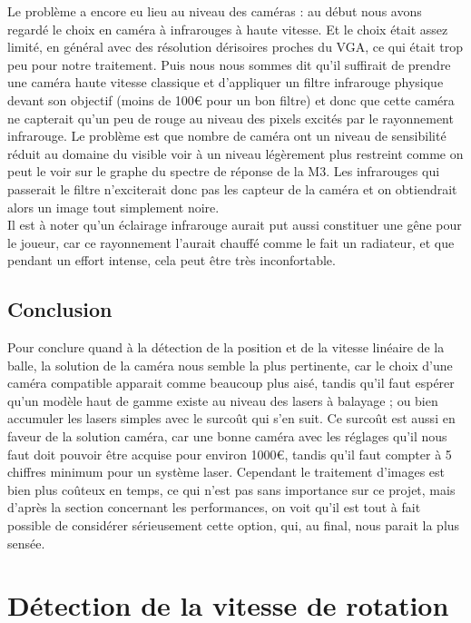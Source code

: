Le problème a encore eu lieu au niveau des caméras : au début nous avons regardé le choix en caméra à infrarouges à haute vitesse. Et le choix était assez limité, en général avec des résolution dérisoires proches du VGA, ce qui était trop peu pour notre traitement. Puis nous nous sommes dit qu'il suffirait de prendre une caméra haute vitesse classique et d'appliquer un filtre infrarouge physique devant son objectif (moins de 100€ pour un bon filtre) et donc que cette caméra ne capterait qu'un peu de rouge au niveau des pixels excités par le rayonnement infrarouge. Le problème est que nombre de caméra ont un niveau de sensibilité réduit au domaine du visible voir à un niveau légèrement plus restreint comme on peut le voir sur le graphe du spectre de réponse de la M3. Les infrarouges qui passerait le filtre n'exciterait donc pas les capteur de la caméra et on obtiendrait alors un image tout simplement noire.\\

Il est à noter qu'un éclairage infrarouge aurait put aussi constituer une gêne pour le joueur, car ce rayonnement l'aurait chauffé comme le fait un radiateur, et que pendant un effort intense, cela peut être très inconfortable.




\subsection{Conclusion}

Pour conclure quand à la détection de la position et de la vitesse linéaire de la balle, la solution de la caméra nous semble la plus pertinente, car le choix d'une caméra compatible apparait comme beaucoup plus aisé, tandis qu'il faut espérer qu'un modèle haut de gamme existe au niveau des lasers à balayage ; ou bien accumuler les lasers simples avec le surcoût qui s'en suit. Ce surcoût est aussi en faveur de la solution caméra, car une bonne caméra avec les réglages qu'il nous faut doit pouvoir être acquise pour environ 1000€, tandis qu'il faut compter à 5 chiffres minimum pour un système laser. Cependant le traitement d'images est bien plus coûteux en temps, ce qui n'est pas sans importance sur ce projet, mais d'après la section concernant les performances, on voit qu'il est tout à fait possible de considérer sérieusement cette option, qui, au final, nous parait la plus sensée.


\section{Détection de la vitesse de rotation}

